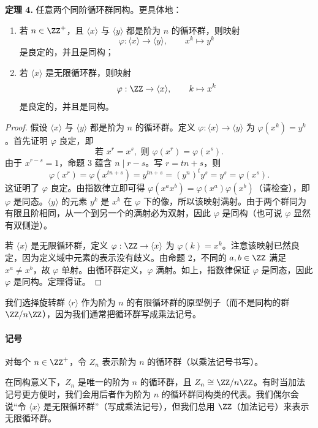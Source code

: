 \medskip
\noindent\textbf{定理 4.} 任意两个同阶循环群同构。更具体地：
\begin{enumerate}[label=(\arabic*)]
  \item 若 $n\in\ZZ^+$，且 $\langle x\rangle$ 与 $\langle y\rangle$ 都是阶为 $n$ 的循环群，则映射
  \[
    \varphi:\langle x\rangle\to \langle y\rangle,
    \qquad x^k\mapsto y^k
  \]
  是良定的，并且是同构；
  \item 若 $\langle x\rangle$ 是无限循环群，则映射
  \[
    \varphi:\ZZ\to\langle x\rangle,
    \qquad k\mapsto x^k
  \]
  是良定的，并且是同构。
\end{enumerate}

\begin{proof}
假设 $\langle x\rangle$ 与 $\langle y\rangle$ 都是阶为 $n$ 的循环群。定义 $\varphi:\langle x\rangle\to\langle y\rangle$ 为 $\varphi(x^k)=y^k$。首先证明 $\varphi$ 良定，即
\[
  \text{若 }x^r=x^s,\text{ 则 }\varphi(x^r)=\varphi(x^s).
\]
由于 $x^{r-s}=1$，命题 3 蕴含 $n\mid r-s$。写 $r=tn+s$，则
\[
  \varphi(x^r)=\varphi(x^{tn+s})=y^{tn+s}=(y^n)^t y^s=y^s=\varphi(x^s).
\]
这证明了 $\varphi$ 良定。由指数律立即可得 $\varphi(x^a x^b)=\varphi(x^a)\varphi(x^b)$（请检查），即 $\varphi$ 是同态。$\langle y\rangle$ 的元素 $y^k$ 是 $x^k$ 在 $\varphi$ 下的像，所以该映射满射。由于两个群同为有限且阶相同，从一个到另一个的满射必为双射，因此 $\varphi$ 是同构（也可说 $\varphi$ 显然有双侧逆）。

若 $\langle x\rangle$ 是无限循环群，定义 $\varphi:\ZZ\to\langle x\rangle$ 为 $\varphi(k)=x^k$。注意该映射已然良定，因为定义域中元素的表示没有歧义。由命题 2，不同的 $a,b\in\ZZ$ 满足 $x^a\neq x^b$，故 $\varphi$ 单射。由循环群定义，$\varphi$ 满射。如上，指数律保证 $\varphi$ 是同态，因此 $\varphi$ 是同构。定理得证。
\end{proof}

我们选择旋转群 $\langle r\rangle$ 作为阶为 $n$ 的有限循环群的原型例子（而不是同构的群 $\ZZ/n\ZZ$），因为我们通常把循环群写成乘法记号。

\paragraph{记号} 对每个 $n\in\ZZ^+$，令 $Z_n$ 表示阶为 $n$ 的循环群（以乘法记号书写）。

在同构意义下，$Z_n$ 是唯一的阶为 $n$ 的循环群，且 $Z_n\cong \ZZ/n\ZZ$。有时当加法记号更方便时，我们会用后者作为阶为 $n$ 的循环群同构类的代表。我们偶尔会说“令 $\langle x\rangle$ 是无限循环群”（写成乘法记号），但我们总用 $\ZZ$（加法记号）来表示无限循环群。

